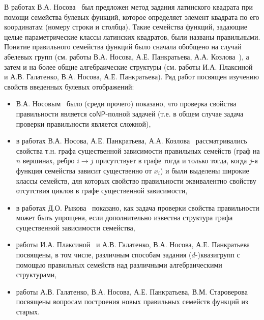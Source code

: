     В работах В.А. Носова~\autocite{nosov98, nosov99} был предложен метод задания латинского квадрата при помощи семейства булевых функций, которое определяет элемент квадрата по его координатам (номеру строки и столбца).
    Такие семейства функций, задающие целые параметрические классы латинских квадратов, были названы правильными.
    Понятие правильного семейства функций было сначала обобщено на случай абелевых групп (см. работы В.А. Носова, А.Е. Панкратьева, А.А. Козлова~\autocite{nosov06, nosov06abel, nosov07, nosov08, kozlov08}), а затем и на более общие алгебраические структуры (см. работы И.А. Плаксиной~\autocite{plaksina14} и А.В. Галатенко, В.А. Носова, А.Е. Панкратьева\autocite{galatenko2020latin}).
    Ряд работ посвящен изучению свойств введенных булевых отображений:
    \begin{itemize}
        \item В.А. Носовым~\autocite{nosov98} было (среди прочего) показано, что проверка свойства правильности является $\mathsf{coNP}$-полной задачей (т.е. в общем случае задача проверки правильности является сложной),
        \item в работах В.А. Носова, А.Е. Панкратьева, А.А. Козлова~\autocite{nosov07, nosov08, kozlov08} рассматривались свойства т.н. графа существенной зависимости правильных семейств (граф на $n$ вершинах, ребро $ i \to j$ присутствует в графе тогда и только тогда, когда $j$-я функция семейства зависит существенно от $x_i$) и были выделены широкие классы семейств, для которых свойство правильности эквивалентно свойству отсутствия циклов в графе существенной зависимости,
        \item в работах Д.О. Рыкова~\autocite{rykov10, rykov14} показано, как задача проверки свойства правильности может быть упрощена, если дополнительно известна структура графа существенной зависимости семейства,
        \item работы И.А. Плаксиной~\autocite{plaksina14} и А.В. Галатенко, В.А. Носова, А.Е. Панкратьева~\autocite{galatenko2020latin} посвящены, в том числе, различным способам задания \mbox{($d$-)квазигрупп} с помощью правильных семейств над различными алгебраическими структурами,
        \item работы А.В. Галатенко, В.А. Носова, А.Е. Панкратьева, В.М. Староверова~\autocite{galatenko21generation, galatenko2022generation} посвящены вопросам построения новых правильных семейств функций из старых.
    \end{itemize}

